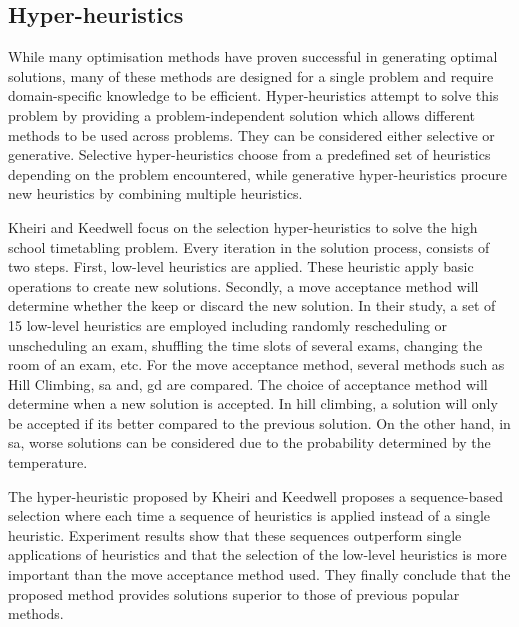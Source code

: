 \subsection{Hyper-heuristics}

While many optimisation methods have proven successful in generating optimal solutions, many of these methods are designed for a single problem and require domain-specific knowledge to be efficient. Hyper-heuristics attempt to solve this problem by providing a problem-independent solution which allows different methods to be used across problems. They can be considered either selective or generative. Selective hyper-heuristics choose from a predefined set of heuristics depending on the problem encountered, while generative hyper-heuristics procure new heuristics by combining multiple heuristics.

Kheiri and Keedwell \cite{kheiri2017} focus on the selection hyper-heuristics to solve the high school timetabling problem. Every iteration in the solution process, consists of two steps. First, low-level heuristics are applied. These heuristic apply basic operations to create new solutions. Secondly, a move acceptance method will determine whether the keep or discard the new solution. In their study, a set of 15 low-level heuristics are employed including randomly rescheduling or unscheduling an exam, shuffling the time slots of several exams, changing the room of an exam, etc. For the move acceptance method, several methods such as Hill Climbing, \acrlong{sa} and, \acrlong{gd} are compared. The choice of acceptance method will determine when a new solution is accepted. In hill climbing, a solution will only be accepted if its better compared to the previous solution. On the other hand, in \acrlong{sa}, worse solutions can be considered due to the probability determined by the temperature.

The hyper-heuristic proposed by Kheiri and Keedwell proposes a sequence-based selection where each time a sequence of heuristics is applied instead of a single heuristic. Experiment results show that these sequences outperform single applications of heuristics and that the selection of the low-level heuristics is more important than the move acceptance method used. They finally conclude that the proposed method provides solutions superior to those of previous popular methods.

